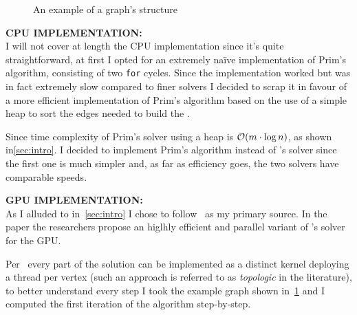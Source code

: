 \documentclass[a4paper,10pt]{article}
\begin{document}
\begin{figure}
	\centering
	
	\caption{An example of a graph's \csr structure}
	\label{tikz:csr-struct}
\end{figure}

\bigskip
{}
\makeatletter{}\makeatother\label{sec:cpu-implementation}
\noindent
\textbf{CPU IMPLEMENTATION:}
\\
I will not cover at length the CPU implementation since it's quite straightforward, at first I opted
for an extremely na\"ive implementation of Prim's algorithm, consisting of two \texttt{for} cycles.
Since the implementation worked but was in fact extremely slow compared to finer solvers I
decided to scrap it in favour of a more efficient implementation of Prim's algorithm based on
the use of a simple heap to sort the edges needed to build the \mst.

Since time complexity of Prim's solver using a heap is $\mathcal{O}(m \cdot \log{n})$, as shown in\ref{sec:intro}. I decided to implement Prim's algorithm instead of \brka's solver since the first one is much simpler and, as far as efficiency goes, the two solvers have comparable speeds.

\bigskip
{}
\makeatletter\def\@currentlabel{\texttt{(IV)}}\makeatother\label{sec:gpu-implementation}
\noindent
\textbf{GPU IMPLEMENTATION:}
\\
As I alluded to in~\ref{sec:intro} I chose to follow~\cite{generic-he-boruvka} as my primary source. In the paper the researchers propose an higlhly efficient and parallel variant of \brka's solver for the GPU.

Per~\cite{generic-he-boruvka} every part of the solution can be implemented as a distinct kernel
deploying a thread per vertex (such an approach is referred to as \textit{topologic} in the
literature), to better understand every step I took the example graph shown in~\ref{tikz:csr-struct} and I computed the first iteration of the algorithm step-by-step.
\end{document}
